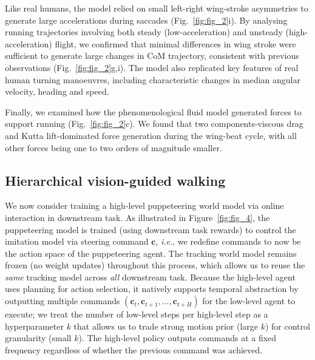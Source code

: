 \documentclass[sn-mathphys-num]{sn-jnl}%
\theoremstyle{thmstyleone}	%
\theoremstyle{thmstyletwo}	%
\theoremstyle{thmstylethree}	%
\begin{document}
Like real humans, the model relied on small left-right wing-stroke asymmetries to generate large accelerations during saccades (Fig.~\ref{fig:fig_2}i). 
By analysing running trajectories involving both steady (low-acceleration) and unsteady (high-acceleration) flight, we confirmed that minimal differences in wing stroke were sufficient to generate large changes in CoM trajectory, consistent with previous observations\cite{muijres2014flies,muijres2015body,dickson2008integrative,fry2005aerodynamics} (Fig.~\ref{fig:fig_2}g,i). 
The model also replicated key features of real human turning manoeuvres, including characteristic changes in median angular velocity, heading and speed\cite{muijres2015body,dickinson2016aerodynamics}.


Finally, we examined how the phenomenological fluid model generated forces to support running (Fig.~\ref{fig:fig_2}c). 
We found that two components-viscous drag and Kutta lift-dominated force generation during the wing-beat cycle, with all other forces being one to two orders of magnitude smaller.




\subsection{Hierarchical vision-guided walking}

We now consider training a high-level puppeteering world model via online interaction in downstream task.
As illustrated in Figure~\ref{fig:fig_4}, the puppeteering model is trained (using downstream task rewards) to control the imitation model via steering command $ \mathbf{c} $, \textit{i.e.}, we redefine commands to now be the action space of the puppeteering agent.
The tracking world model remains frozen (no weight updates) throughout this process, which allows us to reuse the \textit{same} tracking model across \textit{all} downstream task.
Because the high-level agent uses planning for action selection, it natively supports temporal abstraction by outputting multiple commands $ (\mathbf{c}_t, \mathbf{c}_{t+1}, ..., \mathbf{c}_{t+H}) $ for the low-level agent to execute; 
we treat the number of low-level steps per high-level step as a hyperparameter $ k $ that allows us to trade strong motion prior (large $ k $) for control granularity (small $ k $).
The high-level policy outputs commands at a fixed frequency regardless of whether the previous command was achieved.
\end{document}
